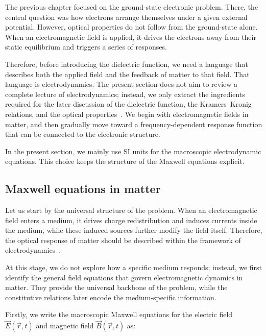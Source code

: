 The previous chapter focused on the ground-state electronic problem.
There, the central question was how electrons arrange themselves under a given external potential.
However, optical properties do not follow from the ground-state alone.
When an electromagnetic field is applied,
it drives the electrons away from their static equilibrium and triggers a series of responses.

Therefore, before introducing the dielectric function, we need a language that describes both the applied field and the feedback of matter to that field.
That language is electrodynamics.
The present section does not aim to review a complete lecture of electrodynamics;
instead, we only extract the ingredients required for the later discussion of the dielectric function, the Kramers--Kronig relations, and the optical properties~\cite{landau2013electrodynamics,griffiths2023introduction}.
We begin with electromagnetic fields in matter, and then gradually move toward a frequency-dependent response function that can be connected to the electronic structure.

In the present section, we mainly use SI units for the macroscopic electrodynamic equations.
This choice keeps the structure of the Maxwell equations explicit.

\subsection{Maxwell equations in matter}

Let us start by the universal structure of the problem.
When an electromagnetic field enters a medium, it drives charge redistribution and induces currents inside the medium, while these induced sources further modify the field itself.
Therefore, the optical response of matter should be described within the framework of electrodynamics~\cite{landau2013electrodynamics,griffiths2023introduction}.

At this stage, we do not explore how a specific medium responds;
instead, we first identify the general field equations that govern electromagnetic dynamics in matter.
They provide the universal backbone of the problem, while the constitutive relations later encode the medium-specific information.

Firstly, we write the macroscopic Maxwell equations for the electric field $\vec{E}(\vec{r},t)$ and magnetic field $\vec{B}(\vec{r},t)$ as:

